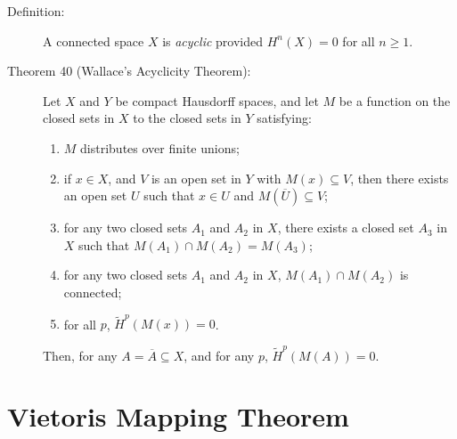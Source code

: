 \documentclass{article}
\begin{document}
\begin{description}

\item[Definition:] A connected space $X$ is \emph{acyclic} provided $H^n(X)=0$ for all $n \geq 1$.

\item[Theorem 40 (Wallace's Acyclicity Theorem):] Let $X$ and $Y$ be compact Hausdorff spaces, and let $M$ be a function on the closed sets in $X$ to the closed sets in $Y$ satisfying:
  \begin{enumerate}[\hspace{1cm}(1)]
    \item $M$ distributes over finite unions;
    \item if $x \in X$, and $V$ is an open set in $Y$ with $M(x) \subseteq V$, then there exists an open set $U$ such that $x \in U$ and $M(\overline U) \subseteq V$;
    \item for any two closed sets $A_1$ and $A_2$ in $X$, there exists a closed set $A_3$ in $X$ such that $M(A_1) \cap M(A_2) = M(A_3)$;
    \item for any two closed sets $A_1$ and $A_2$ in $X$, $M(A_1) \cap M(A_2)$ is connected;
    \item for all $p$, $\widetilde{H}^p(M(x))=0$.
  \end{enumerate}
  Then, for any $A=\overline A \subseteq X$, and for any $p$, ${\widetilde H}^p(M(A))=0$.

\end{description}



\section{Vietoris Mapping Theorem}
\end{document}
